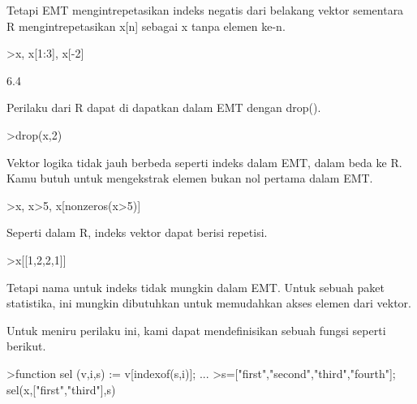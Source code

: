 \documentclass[a4paper,10pt]{article}
\begin{document}
\begin{eulernotebook}
\begin{eulercomment}
\begin{eulercomment}
\begin{eulercomment}
\begin{eulercomment}
\begin{eulercomment}
Tetapi EMT mengintrepetasikan indeks negatis dari belakang vektor
sementara R mengintrepetasikan x[n] sebagai x tanpa elemen ke-n.
\end{eulercomment}
\begin{eulerprompt}
>x, x[1:3], x[-2]
\end{eulerprompt}
\begin{euleroutput}
  [10.4,  5.6,  3.1,  6.4,  21.7]
  [10.4,  5.6,  3.1]
  6.4
\end{euleroutput}
\begin{eulercomment}
Perilaku dari R dapat di dapatkan dalam EMT dengan drop().
\end{eulercomment}
\begin{eulerprompt}
>drop(x,2)
\end{eulerprompt}
\begin{euleroutput}
  [10.4,  3.1,  6.4,  21.7]
\end{euleroutput}
\begin{eulercomment}
Vektor logika tidak jauh berbeda seperti indeks dalam EMT, dalam beda
ke R. Kamu butuh untuk mengekstrak elemen bukan nol pertama dalam EMT.
\end{eulercomment}
\begin{eulerprompt}
>x, x>5, x[nonzeros(x>5)]
\end{eulerprompt}
\begin{euleroutput}
  [10.4,  5.6,  3.1,  6.4,  21.7]
  [1,  1,  0,  1,  1]
  [10.4,  5.6,  6.4,  21.7]
\end{euleroutput}
\begin{eulercomment}
Seperti dalam R, indeks vektor dapat berisi repetisi.
\end{eulercomment}
\begin{eulerprompt}
>x[[1,2,2,1]]
\end{eulerprompt}
\begin{euleroutput}
  [10.4,  5.6,  5.6,  10.4]
\end{euleroutput}
\begin{eulercomment}
Tetapi nama untuk indeks tidak mungkin dalam EMT. Untuk sebuah paket
statistika, ini mungkin dibutuhkan untuk memudahkan akses elemen dari
vektor.

Untuk meniru perilaku ini, kami dapat mendefinisikan sebuah fungsi
seperti berikut.
\end{eulercomment}
\begin{eulerprompt}
>function sel (v,i,s) := v[indexof(s,i)]; ...
>s=["first","second","third","fourth"]; sel(x,["first","third"],s)
\end{eulerprompt}
\begin{euleroutput}
  

\end{euleroutput}
\end{eulercomment}
\end{eulercomment}
\end{eulercomment}
\end{eulercomment}
\end{eulernotebook}
\end{document}
